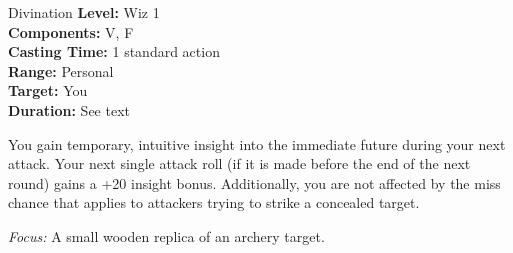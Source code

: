 {Divination}
{
	\textbf{Level:}
	Wiz 1\\
	\textbf{Components:}
	V, F\\
	\textbf{Casting Time:}
	1 standard action\\
	\textbf{Range:}
	Personal\\
	\textbf{Target:}
	You\\
	\textbf{Duration:}
	See text\\
}
{
	You gain temporary, intuitive insight into the immediate future during your next attack. Your next single attack roll (if it is made before the end of the next round) gains a +20 insight bonus. Additionally, you are not affected by the miss chance that applies to attackers trying to strike a concealed target.

	\textit{Focus:}
	A small wooden replica of an archery target.

}
